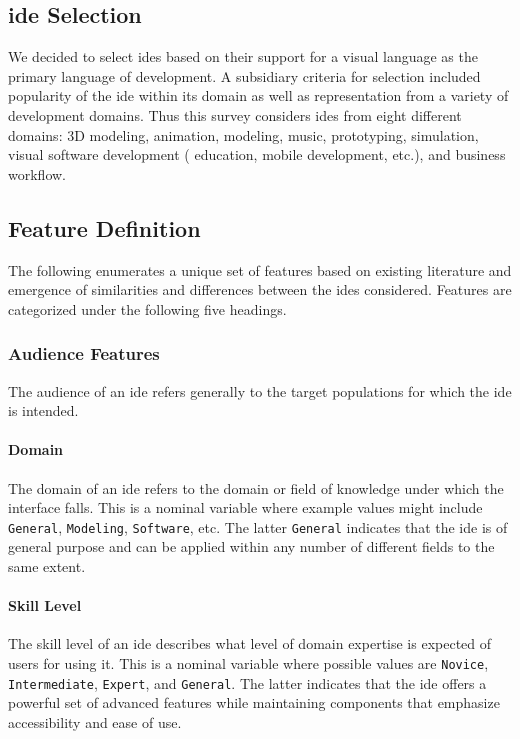 \subsection{\acs{ide} Selection} \label{subsec:ideselection}

We decided to select \acp{ide} based on their support for a visual language
as the primary language of development. A subsidiary criteria for
selection included popularity of the \ac{ide} within its domain as well as
representation from a variety of development domains. Thus this survey
considers \acp{ide} from eight different domains: 3D modeling, animation,
modeling, music, prototyping, simulation, visual software development (\eg
education, mobile development, etc.), and business workflow.


\subsection{Feature Definition} \label{subsec:featuredefinition}

The following enumerates a unique set of features based on existing literature and emergence of similarities and differences between the \acp{ide} considered.
Features are categorized under the following five headings.


\subsubsection{Audience Features} \label{subsubsec:audience}

The audience of an \ac{ide} refers generally to the target populations for which
the \ac{ide} is intended.


\paragraph{Domain}
The domain of an \ac{ide} refers to the domain or field of
knowledge under which the interface falls.
This is a nominal variable where example values might include \texttt{General}, \texttt{Modeling}, \texttt{Software}, etc.
The latter \texttt{General} indicates that the \ac{ide} is of general purpose and can be applied within any number of different fields to the same extent.


\paragraph{Skill Level}
The skill level of an \ac{ide} describes what level of domain expertise is expected of users for using it.
This is a nominal variable where possible values are \texttt{Novice}, \texttt{Intermediate}, \texttt{Expert}, and \texttt{General}.
The latter indicates that the \ac{ide} offers a powerful set of advanced features while maintaining components that emphasize accessibility and ease of use.


